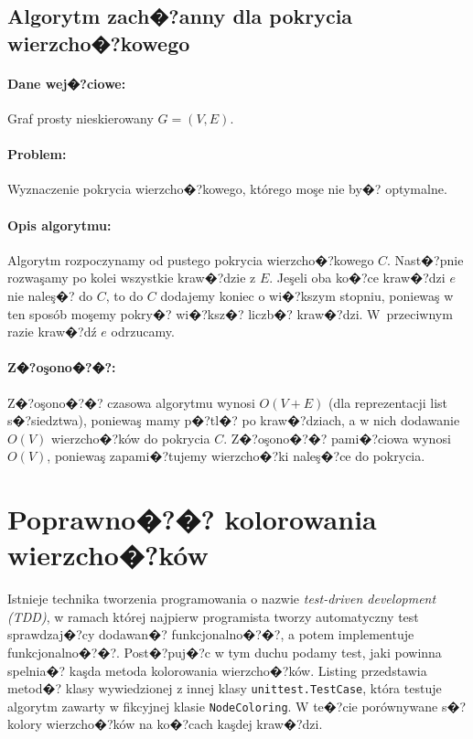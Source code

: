 \documentclass[12pt,a4paper]{mwrep}
\begin{document}
\subsection{Algorytm zach�?anny dla pokrycia wierzcho�?kowego}

\paragraph{Dane wej�?ciowe:} Graf prosty nieskierowany $G=(V,E)$.

\paragraph{Problem:} Wyznaczenie pokrycia wierzcho�?kowego, którego
moşe nie by�? optymalne.

\paragraph{Opis algorytmu:} Algorytm rozpoczynamy od pustego
pokrycia wierzcho�?kowego $C$. 
Nast�?pnie rozwaşamy po kolei wszystkie kraw�?dzie z $E$. 
Jeşeli oba ko�?ce kraw�?dzi $e$ nie naleş�? do $C$,
to do $C$ dodajemy koniec o wi�?kszym stopniu, poniewaş w ten sposób
moşemy pokry�? wi�?ksz�? liczb�? kraw�?dzi.
W~przeciwnym razie kraw�?dź $e$ odrzucamy.

\paragraph{Z�?oşono�?�?:} Z�?oşono�?�? czasowa algorytmu wynosi $O(V+E)$
(dla reprezentacji list s�?siedztwa),
poniewaş mamy p�?tl�? po kraw�?dziach, a w nich dodawanie
$O(V)$ wierzcho�?ków do pokrycia $C$.
Z�?oşono�?�? pami�?ciowa wynosi $O(V)$, poniewaş zapami�?tujemy
wierzcho�?ki naleş�?ce do pokrycia.




\section{Poprawno�?�? kolorowania wierzcho�?ków}
\label{sec:proper_vertex_coloring}

Istnieje technika tworzenia programowania o nazwie 
\emph{test-driven development (TDD)}, w ramach której najpierw
programista tworzy automatyczny test sprawdzaj�?cy dodawan�?
funkcjonalno�?�?, a potem implementuje funkcjonalno�?�?.
Post�?puj�?c w tym duchu podamy test, jaki powinna spelnia�?
kaşda metoda kolorowania wierzcho�?ków.
Listing przedstawia metod�? klasy wywiedzionej z innej klasy
\lstinline|unittest.TestCase|, która testuje algorytm
zawarty w fikcyjnej klasie \lstinline|NodeColoring|.
W te�?cie porównywane s�? kolory wierzcho�?ków na ko�?cach kaşdej
kraw�?dzi.
\end{document}
